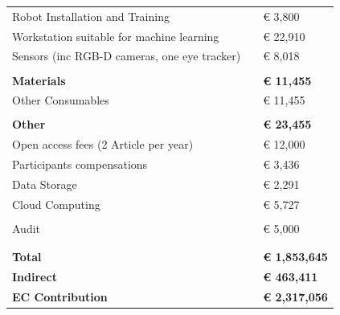 \documentclass[11pt,a4paper]{report}
\begin{document}
\begin{table}[]
\begin{tabular}{@{}lll@{}}
Robot Installation and Training                                  &           & € 3,800              \\
Workstation suitable for machine learning                        &           & € 22,910             \\
Sensors (inc RGB-D cameras, one eye tracker)                     &           & € 8,018              \\
                                                                 &           &                      \\
\textbf{Materials}                                               & \textbf{} & \textbf{€ 11,455}    \\ \midrule
Other Consumables                                                &           & € 11,455             \\
                                                                 &           &                      \\
\textbf{Other}                                                   & \textbf{} & \textbf{€ 23,455}    \\ \midrule
Open access fees (2 Article per year)                            &           & € 12,000             \\
Participants compensations                                       &           & € 3,436              \\
Data Storage                                                     &           & € 2,291              \\
Cloud Computing                                                  &           & € 5,727              \\
                                                                 &           &                      \\
Audit                                                            &           & € 5,000              \\
                                                                 &           &                      \\
                                                                 &           &                      \\ \midrule
\textbf{Total}                                                   & \textbf{} & \textbf{€ 1,853,645} \\
\textbf{Indirect}                                                & \textbf{} & \textbf{€ 463,411}   \\
\textbf{EC Contribution}                                         & \textbf{} & \textbf{€ 2,317,056} \\ \bottomrule
\end{tabular}
\end{table}
\end{document}
